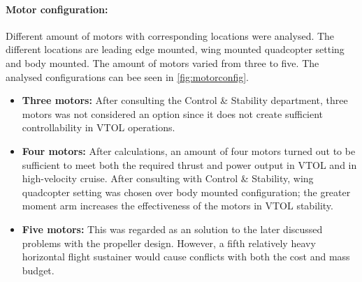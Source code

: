 \paragraph{Motor configuration:} Different amount of motors with corresponding locations were analysed. The different locations are leading edge mounted, wing mounted quadcopter setting and body mounted. The amount of motors varied from three to five. The analysed configurations can bee seen in \autoref{fig:motorconfig}.


\begin{itemize}
    \item \textbf{Three motors:} After consulting the Control \& Stability department, three motors was not considered an option since it does not create sufficient controllability in VTOL operations.
    \item \textbf{Four motors:} After calculations, an amount of four motors turned out to be sufficient to meet both the required thrust and power output in VTOL and in high-velocity cruise. After consulting with Control \& Stability, wing quadcopter setting was chosen over body mounted configuration; the greater moment arm increases the effectiveness of the motors in VTOL stability. 
    \item \textbf{Five motors:} This was regarded as an solution to the later discussed problems with the propeller design. However, a fifth relatively heavy horizontal flight sustainer would cause conflicts with both the cost and mass budget. 
\end{itemize}

